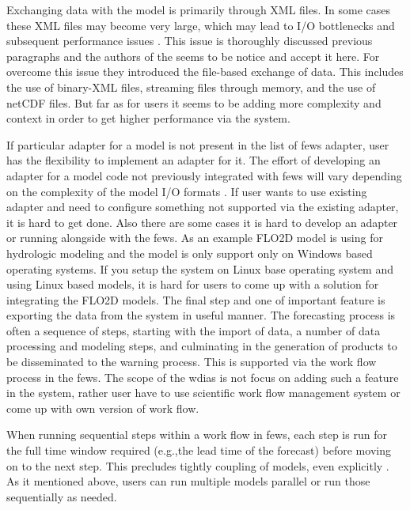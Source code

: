 Exchanging data with the model is primarily through XML files. In some cases these XML files may become very large, which may lead to I/O bottlenecks and subsequent performance issues \cite{Werner2013TheSystem}. This issue is thoroughly discussed previous paragraphs and the authors of the \cite{Werner2013TheSystem} seems to be notice and accept it here. For overcome this issue they introduced the file-based exchange of data. This includes the use of binary-XML files, streaming files through memory, and the use of \acrshort{netCDF} files. But far as for users it seems to be adding more complexity and context in order to get higher performance via the system.

If particular adapter for a model is not present in the list of \acrshort{fews} adapter, user has the flexibility to implement an adapter for it. The effort of developing an adapter for a model code not previously integrated with \acrshort{fews} will vary depending on the complexity of the model I/O formats \cite{Werner2013TheSystem}. If user wants to use existing adapter and need to configure something not supported via the existing adapter, it is hard to get done. Also there are some cases it is hard to develop an adapter or running alongside with the \acrshort{fews}. As an example FLO2D model is using for hydrologic modeling and the model is only support only on Windows based operating systems. If you setup the system on Linux base operating system and using Linux based models, it is hard for users to come up with a solution for integrating the FLO2D models.
The final step and one of important feature is exporting the data from the system in useful manner.
The forecasting process is often a sequence of steps, starting with the import of data, a number of data processing and modeling steps, and culminating in the generation of products to be disseminated to the warning process. This is supported via the work flow process in the \acrshort{fews}. The scope of the \acrshort{wdias} is not focus on adding such a feature in the system, rather user have to use scientific work flow management system or come up with own version of work flow.

When running sequential steps within a work flow in \acrshort{fews}, each step is run for the full time window required (e.g.,the lead time of the forecast) before moving on to the next step. This precludes tightly coupling of models, even explicitly \cite{Werner2013TheSystem}. As it mentioned above, users can run multiple models parallel or run those sequentially as needed. 
